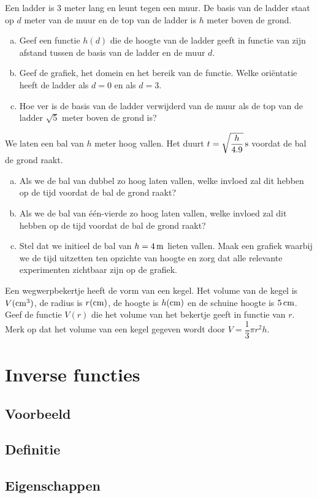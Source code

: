 \documentclass[12pt,twoside]{article}
\begin{document}
\begin{oefening} %
Een ladder is 3 meter lang en leunt tegen een muur. De basis van de ladder staat op $d$ meter van de muur en de top van de ladder is $h$ meter boven de grond.
\begin{enumerate}[(a)]
  \item Geef een functie $h(d)$ die de hoogte van de ladder geeft in functie van zijn afstand tussen de basis van de ladder en de muur $d$.
  \item Geef de grafiek, het domein en het bereik van de functie. Welke oriëntatie heeft de ladder als $d=0$ en als $d=3$.
  \item Hoe ver is de basis van de ladder verwijderd van de muur als de top van de ladder $\sqrt{5}$ meter boven de grond is?
\end{enumerate}
\end{oefening}

\begin{oefening} %
We laten een bal van $h$ meter hoog vallen. Het duurt $t=\sqrt{\dfrac{h}{4.9}}\s$ voordat de bal de grond raakt.
\begin{enumerate}[(a)]
  \item Als we de bal van dubbel zo hoog laten vallen, welke invloed zal dit hebben op de tijd voordat de bal de grond raakt?
  \item Als we de bal van één-vierde zo hoog laten vallen, welke invloed zal dit hebben op de tijd voordat de bal de grond raakt?
  \item Stel dat we initieel de bal van $h=4\m$ lieten vallen. Maak een grafiek waarbij we de tijd uitzetten ten opzichte van hoogte en zorg dat alle relevante experimenten zichtbaar zijn op de grafiek.
\end{enumerate}
\end{oefening}

\begin{oefening} %
Een wegwerpbekertje heeft de vorm van een kegel. Het volume van de kegel is $V (\cm^3)$, de radius is $r (\cm)$, de hoogte is $h (\cm)$ en de schuine hoogte is $5 \cm$. Geef de functie $V(r)$ die het volume van het bekertje geeft in functie van $r$. Merk op dat het volume van een kegel gegeven wordt door $V=\dfrac{1}{3}\pi r^2 h$.
\end{oefening}

\pagebreak
\section{Inverse functies}

\subsection{Voorbeeld}

\subsection{Definitie}

\subsection{Eigenschappen}
\end{document}
